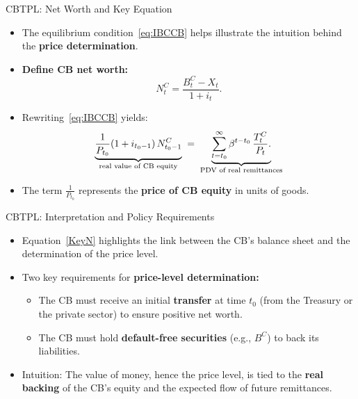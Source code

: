\documentclass[11pt,aspectratio=169]{beamer}
\begin{document}
\begin{frame}{CBTPL: Net Worth and Key Equation}


\begin{itemize}
  \item The equilibrium condition~\eqref{eq:IBCCB} helps illustrate the intuition 
  behind the \textbf{price determination}.
  
  \vspace{0.25cm}
  \item \textbf{Define CB net worth:}
  \begin{equation}
  N_t^C = \frac{B_t^C - X_t}{1+i_t}.
    \label{eq: NW}
    \end{equation}
   
  
  \vspace{0.25cm}
  \item Rewriting~\eqref{eq:IBCCB} yields:
  \begin{equation}
  \underbrace{\frac{1}{P_{t_0}}(1+i_{t_0-1})\,N_{t_0-1}^C}_{\text{\scriptsize real value of CB equity}}
  \;=\;
  \underbrace{\sum_{t=t_0}^{\infty} \beta^{t-t_0}\,\frac{T_t^C}{P_t}.}_{\text{\scriptsize PDV of real remittances}}
  \label{KeyN}
  \end{equation}
  
  \vspace{0.15cm}
  \item The term $\tfrac{1}{P_{t_0}}$ represents the \textbf{price of CB equity} in units of goods.
\end{itemize}

\end{frame}


\begin{frame}{CBTPL: Interpretation and Policy Requirements}


\begin{itemize}
  \item Equation~\eqref{KeyN} highlights the link between the CB’s balance sheet 
  and the determination of the price level.

  \vspace{0.3cm}
  \item Two key requirements for \textbf{price-level determination:}
  \begin{itemize}
    \item The CB must receive an initial \textbf{transfer} at time $t_0$ 
    (from the Treasury or the private sector) to ensure positive net worth.
    \item The CB must hold \textbf{default-free securities} (e.g., $B^C$) 
    to back its liabilities.
  \end{itemize}

  \vspace{0.3cm}
  \item Intuition:  
  The value of money, hence the price level, is tied to the \textbf{real backing} 
  of the CB’s equity and the expected flow of future remittances.
\end{itemize}

\end{frame}
\end{document}
